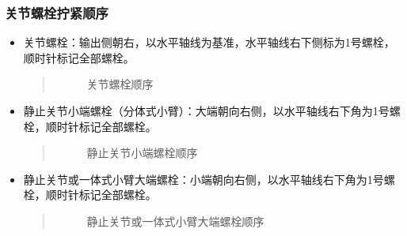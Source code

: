 \documentclass[a4paper,11pt,english,openany,oneside]{sphinxmanual}
\begin{document}
\subsubsection{关节螺栓拧紧顺序}
\label{\detokenize{_u66f4_u6362_u5173_u8282:id7}}\label{\detokenize{_u66f4_u6362_u5173_u8282:id8}}
\sphinxAtStartPar
{}
\begin{itemize}
\item {} 
\sphinxAtStartPar
关节螺栓：输出侧朝右，以水平轴线为基准，水平轴线右下侧标为1号螺栓，顺时针标记全部螺栓。
\begin{quote}

\begin{figure}[H]
\centering
\capstart

\noindent{}
\caption{关节螺栓顺序}\label{\detokenize{_u66f4_u6362_u5173_u8282:id21}}\end{figure}
\end{quote}

\item {} 
\sphinxAtStartPar
静止关节小端螺栓（分体式小臂）：大端朝向右侧，以水平轴线右下角为1号螺栓，顺时针标记全部螺栓。
\begin{quote}

\begin{figure}[H]
\centering
\capstart

\noindent{}
\caption{静止关节小端螺栓顺序}\label{\detokenize{_u66f4_u6362_u5173_u8282:id22}}\end{figure}
\end{quote}

\item {} 
\sphinxAtStartPar
静止关节或一体式小臂大端螺栓：小端朝向右侧，以水平轴线右下角为1号螺栓，顺时针标记全部螺栓。
\begin{quote}

\begin{figure}[H]
\centering
\capstart

\noindent{}
\caption{静止关节或一体式小臂大端螺栓顺序}\label{\detokenize{_u66f4_u6362_u5173_u8282:id23}}\end{figure}
\end{quote}

\end{itemize}
\end{document}
